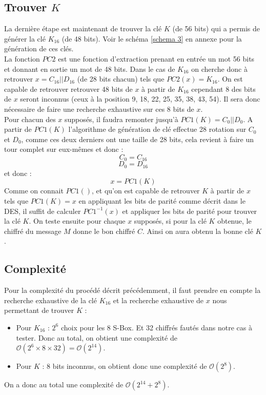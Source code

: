 \documentclass[10pt,a4paper]{article}
\begin{document}
\subsection{Trouver $K$}
La dernière étape est maintenant de trouver la clé $K$ (de 56 bits) qui a permis de générer la clé $K_{16}$ (de 48 bits). Voir le schéma \ref{schema 3} en annexe pour la génération de ces clés.
\\La fonction $PC2$ est une fonction d'extraction prenant en entrée un mot 56 bits et donnant en sortie un mot de 48 bits. Dans le cas de $K_{16}$ on cherche donc à retrouver $x = C_{16}||D_{16}$ (de 28 bits chacun) tels que $PC2(x) =  K_{16}$. On est capable de retrouver retrouver 48 bits de $x$ à partir de $K_{16}$ cependant 8 des bits de $x$ seront inconnus (ceux à la position 9, 18, 22, 25, 35, 38, 43, 54). Il sera donc nécessaire de faire une recherche exhaustive sur ces 8 bits de $x$.
\\Pour chacun des $x$ supposés, il faudra remonter jusqu'à $PC1(K) = C_{0}||D_{0}$. A partir de $PC1(K)$ l'algorithme de génération de clé effectue 28 rotation sur $C_{0}$ et $D_{0}$, comme ces deux derniers ont une taille de 28 bits, cela revient à faire un tour complet sur eux-mêmes et donc :
\[C_{0} = C_{16}\]
\[D_{0} = D_{16}\]
et donc :
\[x = PC1(K)\]
Comme on connait $PC1()$, et qu'on est capable de retrouver $K$ à partir de $x$ tels que $PC1(K) = x$ en appliquant les bits de parité comme décrit dans le DES, il suffit de calculer $PC1^{-1}(x)$ et appliquer les bits de parité pour trouver la clé $K$. On teste ensuite pour chaque $x$ supposés, si pour la clé $K$ obtenue, le chiffré du message $M$ donne le bon chiffré $C$. Ainsi on aura obtenu la bonne clé $K$.

\subsection{Complexité}
Pour la complexité du procédé décrit précédemment, il faut prendre en compte la recherche exhaustive de la clé $K_{16}$ et la recherche exhaustive de $x$ nous permettant de trouver $K$ :
\begin{itemize}
\item Pour $K_{16}$ : $2^{6}$ choix pour les 8 S-Box. Et 32 chiffrés fautés dans notre cas à tester. Donc au total, on obtient une complexité de $\mathcal{O}(2^{6}\times 8 \times 32) = \mathcal{O}(2^{14})$.
\item Pour $K$ : 8 bits inconnus, on obtient donc une complexité de $\mathcal{O}(2^{8})$.
\end{itemize}
On a donc au total une complexité de $\mathcal{O}(2^{14} + 2^{8})$.
\end{document}
